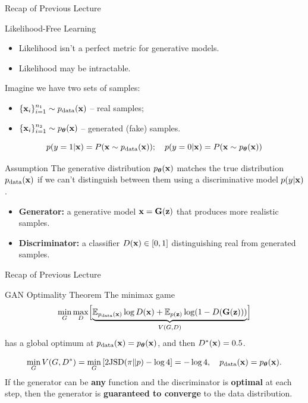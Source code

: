 \documentclass{beamer}
\begin{document}
\begin{frame}
	\titlepage
	\resetonslide	
\end{frame}
\begin{frame}{Recap of Previous Lecture}
	\begin{block}{Likelihood-Free Learning}
		\begin{itemize}
			\item Likelihood isn't a perfect metric for generative models.
			\item Likelihood may be intractable.
		\end{itemize}
	\end{block}
	Imagine we have two sets of samples:
	\begin{itemize}
		\item $\{\mathbf{x}_i\}_{i=1}^{n_1} \sim p_{\text{data}}(\mathbf{x})$ -- real samples;
		\item $\{\mathbf{x}_i\}_{i=1}^{n_2} \sim p_{\boldsymbol{\theta}}(\mathbf{x})$ -- generated (fake) samples.
	\end{itemize}
	\[
		p(y = 1 | \mathbf{x}) = P(\mathbf{x} \sim p_{\text{data}}(\mathbf{x})); \quad p(y = 0 | \mathbf{x}) = P(\mathbf{x} \sim p_{\boldsymbol{\theta}}(\mathbf{x}))
	\]
	\vspace{-0.5cm}
	\begin{block}{Assumption}
		The generative distribution $p_{\boldsymbol{\theta}}(\mathbf{x})$ matches the true distribution $p_{\text{data}}(\mathbf{x})$ if we can't distinguish between them using a discriminative model $p(y|\mathbf{x})$.
	\end{block}
	\begin{itemize}
		\item \textbf{Generator:} a generative model $\mathbf{x} = \mathbf{G}(\mathbf{z})$ that produces more realistic samples.
		\item \textbf{Discriminator:} a classifier $D(\mathbf{x}) \in [0, 1]$ distinguishing real from generated samples.
	\end{itemize}
\end{frame}
\begin{frame}{Recap of Previous Lecture}
	\begin{block}{GAN Optimality Theorem}
		The minimax game
		\[
		\min_{G} \max_D \Bigl[ \underbrace{\mathbb{E}_{p_{\text{data}}(\mathbf{x})} \log D(\mathbf{x}) + \mathbb{E}_{p(\mathbf{z})} \log (1 - D(\mathbf{G}(\mathbf{z})))}_{V(G, D)} \Bigr]
		\]
		has a global optimum at $p_{\text{data}}(\mathbf{x}) = p_{\boldsymbol{\theta}}(\mathbf{x})$, and then $D^*(\mathbf{x}) = 0.5$.
	\end{block}
	\vspace{-0.3cm}
	\[
		\min_{G} V(G, D^*) = \min_{G} \left[ 2 \mathrm{JSD}(\pi \| p) - \log 4 \right] = -\log 4, \quad p_{\text{data}}(\mathbf{x}) = p_{\boldsymbol{\theta}}(\mathbf{x}).
	\]
	If the generator can be \textbf{any} function and the discriminator is \textbf{optimal} at each step, then the generator is \textbf{guaranteed to converge} to the data distribution.  
\end{frame}
\end{document}
